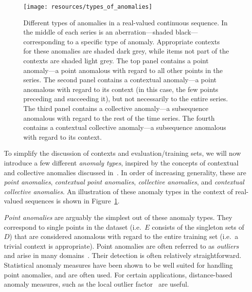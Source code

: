 \begin{figure}[htb]
    \begin{center}
        \texttt{[image: resources/types\_of\_anomalies]}
    \end{center}
    \caption{{\small Different types of anomalies in a real-valued continuous sequence. In the middle of each series is an aberration---shaded black---corresponding to a specific type of anomaly. Appropriate contexts for these anomalies are shaded dark grey, while items not part of the contexts are shaded light grey. The top panel contains a point anomaly---a point anomalous with regard to all other points in the series. The second panel contains a contextual anomaly---a point anomalous with regard to its context (in this case, the few points preceding and succeeding it), but not necessarily to the entire series. The third panel contains a collective anomaly---a subsequence anomalous with regard to the rest of the time series. The fourth contains a contextual collective anomaly---a subsequence anomalous with regard to its context.}}
\label{fig:anomaly_types}
\end{figure}

To simplify the discussion of contexts and evaluation/training sets, we will now introduce a few different \emph{anomaly types}, inspired by the concepts of contextual and collective anomalies discussed in~\cite{chandola}. In order of increasing generality, these are \emph{point anomalies}, \emph{contextual point anomalies}, \emph{collective anomalies}, and \emph{contextual collective anomalies}. An illustration of these anomaly types in the context of real-valued sequences is shown in Figure~\ref{fig:anomaly_types}.

\emph{Point anomalies} are arguably the simplest out of these anomaly types. They correspond to single points in the dataset (i.e.\ $E$ consists of the singleton sets of $D$) that are considered anomalous with regard to the entire training set (i.e.\ a trivial context is appropriate). Point anomalies are often referred to as \emph{outliers} and arise in many domains~\cite{eskin}. Their detection is often relatively straightforward. Statistical anomaly measures have been shown to be well suited for handling point anomalies, and are often used. For certain applications, distance-based anomaly measures, such as the local outlier factor~\cite{TODO} are useful.

